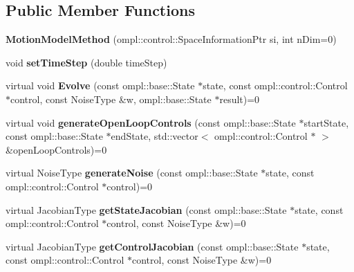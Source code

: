 \subsection*{\-Public \-Member \-Functions}
\begin{DoxyCompactItemize}
\item 
\hypertarget{class_motion_model_method_ae5ef4bfae24bc1674db07f785eb7d6f4}{{\bfseries \-Motion\-Model\-Method} (ompl\-::control\-::\-Space\-Information\-Ptr si, int n\-Dim=0)}\label{class_motion_model_method_ae5ef4bfae24bc1674db07f785eb7d6f4}

\item 
\hypertarget{class_motion_model_method_aa15c21f81b71cfe8c65224bbdfba61d8}{void {\bfseries set\-Time\-Step} (double time\-Step)}\label{class_motion_model_method_aa15c21f81b71cfe8c65224bbdfba61d8}

\item 
\hypertarget{class_motion_model_method_a9fafbf79b4ea570819e01050dadf4826}{virtual void {\bfseries \-Evolve} (const ompl\-::base\-::\-State $\ast$state, const ompl\-::control\-::\-Control $\ast$control, const \-Noise\-Type \&w, ompl\-::base\-::\-State $\ast$result)=0}\label{class_motion_model_method_a9fafbf79b4ea570819e01050dadf4826}

\item 
\hypertarget{class_motion_model_method_a6ec853871652bfa2c4fdad2c46e81e44}{virtual void {\bfseries generate\-Open\-Loop\-Controls} (const ompl\-::base\-::\-State $\ast$start\-State, const ompl\-::base\-::\-State $\ast$end\-State, std\-::vector$<$ ompl\-::control\-::\-Control $\ast$ $>$ \&open\-Loop\-Controls)=0}\label{class_motion_model_method_a6ec853871652bfa2c4fdad2c46e81e44}

\item 
\hypertarget{class_motion_model_method_a036e2254bcae3730fe157419f9cf9c19}{virtual \-Noise\-Type {\bfseries generate\-Noise} (const ompl\-::base\-::\-State $\ast$state, const ompl\-::control\-::\-Control $\ast$control)=0}\label{class_motion_model_method_a036e2254bcae3730fe157419f9cf9c19}

\item 
\hypertarget{class_motion_model_method_af1429b7c54c0b6bdde9e6b8272bbb50e}{virtual \-Jacobian\-Type {\bfseries get\-State\-Jacobian} (const ompl\-::base\-::\-State $\ast$state, const ompl\-::control\-::\-Control $\ast$control, const \-Noise\-Type \&w)=0}\label{class_motion_model_method_af1429b7c54c0b6bdde9e6b8272bbb50e}

\item 
\hypertarget{class_motion_model_method_aac2be89931926f5883fd4e0ec0b7a073}{virtual \-Jacobian\-Type {\bfseries get\-Control\-Jacobian} (const ompl\-::base\-::\-State $\ast$state, const ompl\-::control\-::\-Control $\ast$control, const \-Noise\-Type \&w)=0}\label{class_motion_model_method_aac2be89931926f5883fd4e0ec0b7a073}


\end{DoxyCompactItemize}
